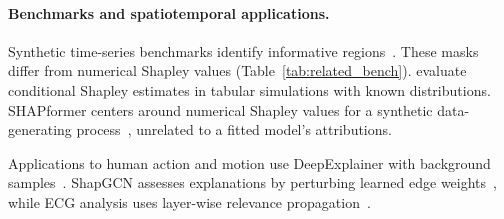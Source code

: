 \paragraph{Benchmarks and spatiotemporal applications.}
Synthetic time-series benchmarks identify informative
regions~\citep{ismail2020benchmarking,hollig2023xtsc,baer2026xaitimesynth}. These masks differ from numerical Shapley values
(Table~\ref{tab:related_bench}). \citet{olsen2022using,olsen2024comparative} evaluate conditional Shapley
estimates in tabular simulations with known distributions. SHAPformer centers around numerical Shapley values for a synthetic data-generating process~\citep{hertel2026shapformer}, unrelated to a fitted model's attributions.

Applications to human action and motion use DeepExplainer with background samples~\citep{auletta2023predicting,tempel2025choose}. ShapGCN assesses explanations by perturbing learned edge weights~\citep{tempel2025explaining}, while ECG analysis uses layer-wise relevance propagation~\citep{strodthoff2021ecg}. %
